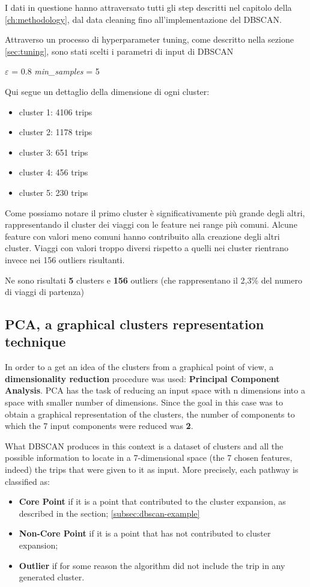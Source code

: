 I dati in questione hanno attraversato tutti gli step descritti nel capitolo della \ref{ch:methodology}, dal data cleaning fino all'implementazione del DBSCAN.

Attraverso un processo di hyperparameter tuning, come descritto nella sezione \ref{sec:tuning}, sono stati scelti i parametri di input di DBSCAN 

\begin{center} 
    $\varepsilon$ = 0.8 \textit{min\_samples} = 5
\end{center} 

Qui segue un dettaglio della dimensione di ogni cluster:
\begin{itemize}
\item cluster 1: 4106 trips
\item cluster 2: 1178 trips
\item cluster 3: 651 trips
\item cluster 4: 456 trips
\item cluster 5: 230 trips
\end{itemize}

Come possiamo notare il primo cluster è significativamente più grande degli altri, rappresentando il cluster dei viaggi con le feature nei range più comuni. Alcune feature con valori meno comuni hanno contribuito alla creazione degli altri cluster. Viaggi con valori troppo diversi rispetto a quelli nei cluster rientrano invece nei 156 outliers risultanti.




Ne sono risultati \textbf{5} clusters e \textbf{156} outliers (che rappresentano il 2,3\% del numero di viaggi di partenza)

\clearpage
\subsection{PCA, a graphical clusters representation technique}
\label{sec:pca}

In order to a get an idea of the clusters from a graphical point of view, a \textbf{dimensionality reduction} procedure was used: \textbf{Principal Component Analysis}.
PCA has the task of reducing an input space with n dimensions into a space with smaller number of dimensions.
Since the goal in this case was to obtain a graphical representation of the clusters, the number of components to which the 7 input components were reduced was \textbf{2}.

What DBSCAN produces in this context is a dataset of clusters and all the possible information to locate in a 7-dimensional space (the 7 chosen features, indeed) the trips that were given to it as input.
More precisely, each pathway is classified as:
\begin{itemize}
\item \textbf{Core Point} if it is a point that contributed to the cluster expansion, as described in the section; \ref{subsec:dbscan-example}
\item \textbf{Non-Core Point} if it is a point that has not contributed to cluster expansion;
\item \textbf{Outlier} if for some reason the algorithm did not include the trip in any generated cluster.
\end{itemize}

